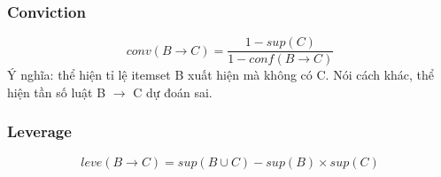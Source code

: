 \documentclass{article}
\begin{document}
\subsubsection{Conviction}
\begin{equation}
	conv\left( B \to C \right) = \frac{1 - sup \left( C \right)}{1 - conf \left( B \to C \right)}
\end{equation}
Ý nghĩa: thể hiện tỉ lệ itemset B xuất hiện mà không có C. Nói cách khác, thể hiện tần số luật B $\to$ C dự đoán sai.
\subsubsection{Leverage}
\begin{equation}
	leve(B \to C) = sup \left(B \cup C \right) - sup\left(B\right) \times sup\left(C\right)
\end{equation}
\end{document}
